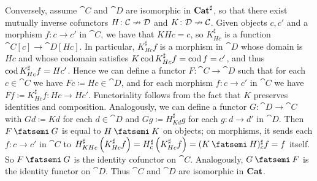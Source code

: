 \documentclass[Book-Poly]{subfiles}
\begin{document}
\begin{exercise}
\begin{solution}
Conversely, assume $\cat{C}$ and $\cat{D}$ are isomorphic in $\mathbf{Cat}^\sharp$, so that there exist mutually inverse cofunctors $H\colon\mathcal{C}\nrightarrow\mathcal{D}$ and $K\colon\mathcal{D}\nrightarrow\mathcal{C}$.
Given objects $c,c'$ and a morphism $f\colon c\to c'$ in $\cat{C}$, we have that $KHc=c$, so $K^\sharp_{Hc}$ is a function $\cat{C}[c]\to\cat{D}[Hc]$.
In particular, $K^\sharp_{Hc}f$ is a morphism in $\cat{D}$ whose domain is $Hc$ and whose codomain satisfies $K\operatorname{cod} K^\sharp_{Hc}f=\operatorname{cod} f=c'$, and thus $\operatorname{cod} K^\sharp_{Hc}f=Hc'$.
Hence we can define a functor $F\colon\cat{C}\to\cat{D}$ such that for each $c\in\cat{C}$ we have $Fc\coloneqq Hc\in\cat{D}$, and for each morphism $f\colon c\to c'$ in $\cat{C}$ we have $Ff\coloneqq K^\sharp_{Hc}f\colon Hc\to Hc'$.
Functoriality follows from the fact that $K$ preserves identities and composition.
Analogously, we can define a functor $G\colon\cat{D}\to\cat{C}$ with $Gd\coloneqq Kd$ for each $d\in\cat{D}$ and $Gg\coloneqq H^\sharp_{Kd}g$ for each $g\colon d\to d'$ in $\cat{D}$.
Then $F\then G$ is equal to $H\then K$ on objects; on morphisms, it sends each $f\colon c\to c'$ in $\cat{C}$ to $H^\sharp_{KHc}\left(K^\sharp_{Hc}f\right)=H^\sharp_c\left(K^\sharp_{Hc}f\right)=(K\then H)^\sharp_cf=f$ itself.
So $F\then G$ is the identity cofunctor on $\cat{C}$.
Analogously, $G\then F$ is the identity functor on $\cat{D}$.
Thus $\cat{C}$ and $\cat{D}$ are isomorphic in $\mathbf{Cat}$.
\end{solution}
\end{exercise}







\end{document}
